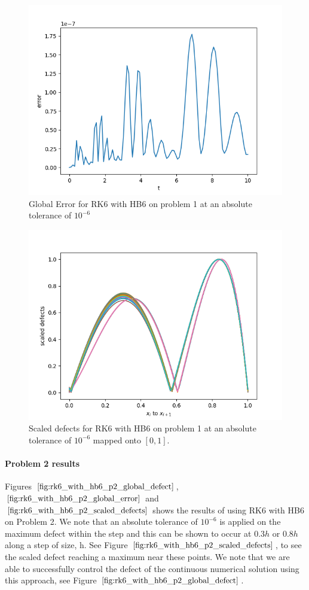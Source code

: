 \begin{figure}[H]
\centering
\includegraphics[width=0.7\linewidth]{./figures/rk6_with_hb6_p1_global_error}
\caption{Global Error for RK6 with HB6 on problem 1 at an absolute tolerance of $10^{-6}$}
\label{fig:rk6_with_hb6_p1_global_error}
\end{figure}

\begin{figure}[H]
\centering
\includegraphics[width=0.7\linewidth]{./figures/rk6_with_hb6_p1_scaled_defects}
\caption{Scaled defects for RK6 with HB6 on problem 1 at an absolute tolerance of $10^{-6}$ mapped onto $[0, 1]$.}
\label{fig:rk6_with_hb6_p1_scaled_defects}
\end{figure}

\paragraph{Problem 2 results}
Figures $\ref{fig:rk6_with_hb6_p2_global_defect}$, $\ref{fig:rk6_with_hb6_p2_global_error}$ and $\ref{fig:rk6_with_hb6_p2_scaled_defects}$ shows the results of using RK6 with HB6 on Problem 2. We note that an absolute tolerance of $10^{-6}$ is applied on the maximum defect within the step and this can be shown to occur at $0.3h$ or $0.8h$ along a step of size, h. See Figure $\ref{fig:rk6_with_hb6_p2_scaled_defects}$, to see the scaled defect reaching a maximum near these points. We note that we are able to successfully control the defect of the continuous numerical solution using this approach, see Figure $\ref{fig:rk6_with_hb6_p2_global_defect}$. 

